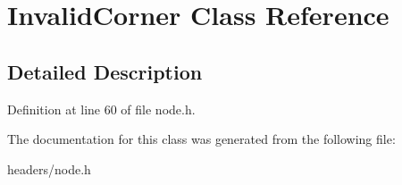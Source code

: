\hypertarget{classInvalidCorner}{\section{Invalid\+Corner Class Reference}
\label{classInvalidCorner}
}


\subsection{Detailed Description}


Definition at line 60 of file node.\+h.



The documentation for this class was generated from the following file\+:\begin{DoxyCompactItemize}
\item 
headers/node.\+h\end{DoxyCompactItemize}
